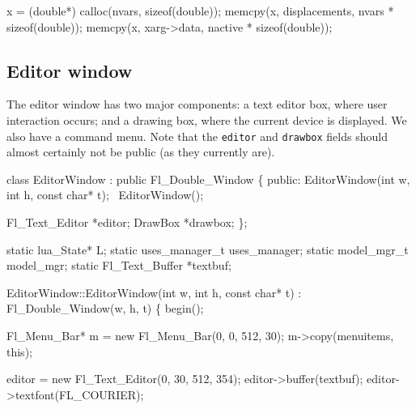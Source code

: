x = (double*) calloc(nvars, sizeof(double));
memcpy(x, displacements, nvars * sizeof(double));
memcpy(x, xarg->data, nactive * sizeof(double));

\nwendcode{}\nwdocspar

\subsection{Editor window}

The editor window has two major components: a text editor box, where
user interaction occurs; and a drawing box, where the current device
is displayed.  We also have a command menu.  Note that the {\tt{}editor} 
and {\tt{}drawbox} fields should almost certainly not be public (as they
currently are).

\nwenddocs{}\endmoddef
class EditorWindow : public Fl_Double_Window \{
public:
    EditorWindow(int w, int h, const char* t);
    ~EditorWindow();

    Fl_Text_Editor     *editor;
    DrawBox            *drawbox;
\};

\nwendcode{}\nwdocspar

\nwenddocs{}\endmoddef
static lua_State*         L;
static uses_manager_t     uses_manager;
static model_mgr_t        model_mgr;
static Fl_Text_Buffer    *textbuf;

\nwendcode{}\nwdocspar

\nwenddocs{}\endmoddef
EditorWindow::EditorWindow(int w, int h, const char* t) : 
    Fl_Double_Window(w, h, t) 
\{
    begin();

      Fl_Menu_Bar* m = new Fl_Menu_Bar(0, 0, 512, 30);
      m->copy(menuitems, this);

      editor = new Fl_Text_Editor(0, 30, 512, 354);
      editor->buffer(textbuf);
      editor->textfont(FL_COURIER);

